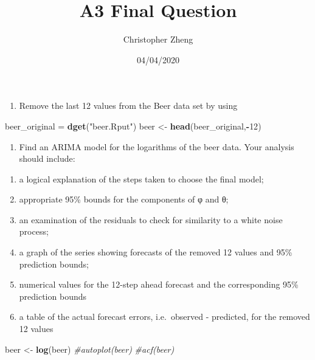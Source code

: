 \documentclass[]{article}
\title{A3 Final Question}
\author{Christopher Zheng}
\date{04/04/2020}
\newenvironment{Shaded}{\begin{snugshade}}{\end{snugshade}}
\newcommand{\CommentTok}[1]{\textcolor[rgb]{0.56,0.35,0.01}{\textit{#1}}}
\newcommand{\DecValTok}[1]{\textcolor[rgb]{0.00,0.00,0.81}{#1}}
\newcommand{\KeywordTok}[1]{\textcolor[rgb]{0.13,0.29,0.53}{\textbf{#1}}}
\newcommand{\NormalTok}[1]{#1}
\newcommand{\OperatorTok}[1]{\textcolor[rgb]{0.81,0.36,0.00}{\textbf{#1}}}
\newcommand{\StringTok}[1]{\textcolor[rgb]{0.31,0.60,0.02}{#1}}
\providecommand{\tightlist}{%
  \setlength{\itemsep}{0pt}\setlength{\parskip}{0pt}}
\begin{document}
\maketitle

\begin{enumerate}
\def\labelenumi{(\alph{enumi})}
\tightlist
\item
  Remove the last 12 values from the Beer data set by using
\end{enumerate}

\begin{Shaded}
\begin{Highlighting}[]
\NormalTok{beer_original =}\StringTok{ }\KeywordTok{dget}\NormalTok{(}\StringTok{"beer.Rput"}\NormalTok{)}
\NormalTok{beer <-}\StringTok{ }\KeywordTok{head}\NormalTok{(beer_original,}\OperatorTok{-}\DecValTok{12}\NormalTok{)}
\end{Highlighting}
\end{Shaded}

\begin{enumerate}
\def\labelenumi{(\alph{enumi})}
\setcounter{enumi}{1}
\tightlist
\item
  Find an ARIMA model for the logarithms of the beer data. Your analysis
  should include:
\end{enumerate}

\begin{enumerate}
\def\labelenumi{\roman{enumi})}
\tightlist
\item
  a logical explanation of the steps taken to choose the final model;
\item
  appropriate 95\% bounds for the components of φ and θ;
\item
  an examination of the residuals to check for similarity to a white
  noise process;
\item
  a graph of the series showing forecasts of the removed 12 values and
  95\% prediction bounds;
\item
  numerical values for the 12-step ahead forecast and the corresponding
  95\% prediction bounds
\item
  a table of the actual forecast errors, i.e.~observed - predicted, for
  the removed 12 values
\end{enumerate}

\begin{Shaded}
\begin{Highlighting}[]
\NormalTok{beer <-}\StringTok{ }\KeywordTok{log}\NormalTok{(beer)}
\CommentTok{#autoplot(beer)}
\CommentTok{#acf(beer)}
\end{Highlighting}
\end{Shaded}
\end{document}

